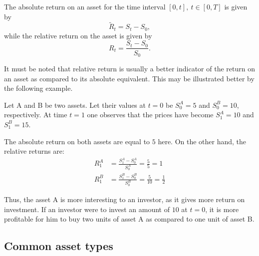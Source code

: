 \begin{dfn}
	The absolute return on an asset for the time interval $ [0, t], \  t \in [0, T] $ is given by
	\begin{equation*}
		\tilde{R}_t = S_t - S_0 ,
	\end{equation*}
	while the relative return on the asset is given by
	\begin{equation*}
		R_t = \frac{S_t - S_0}{S_0} .
	\end{equation*}	
\end{dfn}

It must be noted that relative return is usually a better indicator of the return on an asset as compared to its absolute equivalent. This may be illustrated better by the following example.
\begin{eg}
	Let A and B be two assets. Let their values at $ t = 0 $ be $ S_0^A = 5 $ and $ S_0^B = 10 $, respectively. At time $ t = 1 $ one observes that the prices have become $ S_1^A = 10 $ and $ S_1^B = 15 $.
	
	The absolute return on both assets are equal to $ 5 $ here. On the other hand, the relative returns are:
	\begin{align*}
		R_1^A  &=  \frac{S_1^A - S_0^A}{S_0^A} = \frac{5}{5} = 1  \\
		R_1^B  &=  \frac{S_1^B - S_0^B}{S_0^B} = \frac{5}{10} = \frac{1}{2}
	\end{align*}
	
	Thus, the asset A is more interesting to an investor, as it gives more return on investment. If an investor were to invest an amount of $ 10 $ at $ t = 0 $, it is more profitable for him to buy two units of asset A as compared to one unit of asset B.
\end{eg}


\subsection{Common asset types}

